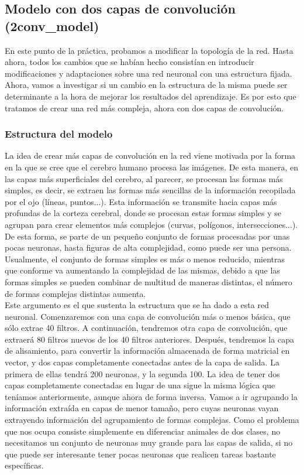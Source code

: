 \documentclass[11pt]{article}
\theoremstyle{plain}
\theoremstyle{definition}
\begin{document}
\subsection{Modelo con dos capas de convolución (2conv\_model)}

En este punto de la práctica, probamos a modificar la topología de la
red. Hasta ahora, todos los cambios que se habían hecho consistían en
introducir modificaciones y adaptaciones sobre una red neuronal con
una estructura fijada. Ahora, vamos a investigar si un cambio en la
estructura de la misma puede ser determinante a la hora de mejorar los
resultados del aprendizaje. Es por esto que tratamos de crear una
red más compleja, ahora con dos capas de convolución.\\


\subsubsection{Estructura del modelo}

La idea de crear más capas de convolución en la red viene motivada por
la forma en la que se cree que el cerebro humano procesa las imágenes.
De esta manera, en las capas más superficiales del cerebro, al
parecer, se procesan las formas más simples, es decir, se extraen las
formas más sencillas de la información recopilada por el ojo (líneas,
puntos...). Esta información se transmite hacia capas más profundas de
la corteza cerebral, donde se procesan estas formas simples y se
agrupan para crear elementos más complejos (curvas, polígonos,
intersecciones...). De esta forma, se parte de un pequeño conjunto de
formas procesadas por unas pocas neuronas, hasta figuras de alta
complejidad, como puede ser una persona. Usualmente, el conjunto de
formas simples es más o menos reducido, mientras que conforme va
aumentando la complejidad de las mismas, debido a que las formas
simples se pueden combinar de multitud de maneras distintas, el número
de formas complejas distintas aumenta.\\

Este argumento es el que sustenta la estructura que se ha dado a esta
red neuronal. Comenzaremos con una capa de convolución más o menos
básica, que sólo extrae 40 filtros. A continuación, tendremos otra
capa de convolución, que extraerá 80 filtros nuevos de los 40 filtros
anteriores. Después, tendremos la capa de alisamiento, para convertir
la información almacenada de forma matricial en vector, y dos capas
completamente conectadas antes de la capa de salida. La primera de
ellas tendrá 200 neuronas, y la segunda 100. La idea de tener dos
capas completamente conectadas en lugar de una sigue la misma lógica
que teníamos anteriormente, aunque ahora de forma inversa. Vamos a ir
agrupando la información extraída en capas de menor tamaño, pero cuyas
neuronas vayan extrayendo información del agrupamiento de formas
complejas. Como el problema que nos ocupa consiste simplemente en
diferenciar animales de dos clases, no necesitamos un conjunto de
neuronas muy grande para las capas de salida, si no que puede ser
interesante tener pocas neuronas que realicen tareas bastante
específicas.\\
\end{document}
